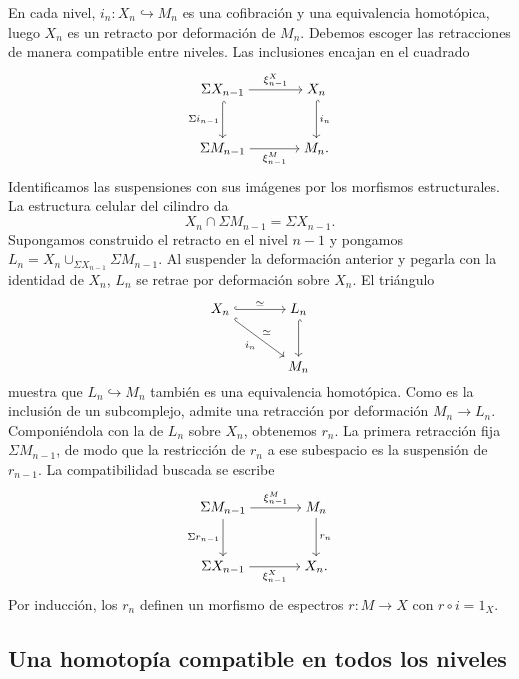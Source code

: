 En cada nivel, $i_n\colon X_n\hookrightarrow M_n$ es una cofibración y una equivalencia homotópica, luego $X_n$ es un retracto por deformación de $M_n$. Debemos escoger las retracciones de manera compatible entre niveles. Las inclusiones encajan en el cuadrado
\[
\begin{tikzcd}[cramped,column sep=large,row sep=large]
\Sigma X_{n-1} \arrow[r,"\xi^X_{n-1}"] \arrow[d,hook,"\Sigma i_{n-1}"']
& X_n \arrow[d,hook,"i_n"]\\
\Sigma M_{n-1} \arrow[r,"\xi^M_{n-1}"'] & M_n.
\end{tikzcd}
\]
Identificamos las suspensiones con sus imágenes por los morfismos estructurales. La estructura celular del cilindro da
\[
X_n\cap\Sigma M_{n-1}=\Sigma X_{n-1}.
\]
Supongamos construido el retracto en el nivel $n-1$ y pongamos $L_n=X_n\cup_{\Sigma X_{n-1}}\Sigma M_{n-1}$. Al suspender la deformación anterior y pegarla con la identidad de $X_n$, $L_n$ se retrae por deformación sobre $X_n$. El triángulo
\[
\begin{tikzcd}[cramped,column sep=large,row sep=large]
X_n \arrow[r,hook,"\simeq"] \arrow[dr,hook,"i_n"',"\simeq"]
& L_n \arrow[d,hook]\\
& M_n
\end{tikzcd}
\]
muestra que $L_n\hookrightarrow M_n$ también es una equivalencia homotópica. Como es la inclusión de un subcomplejo, admite una retracción por deformación $M_n\to L_n$. Componiéndola con la de $L_n$ sobre $X_n$, obtenemos $r_n$. La primera retracción fija $\Sigma M_{n-1}$, de modo que la restricción de $r_n$ a ese subespacio es la suspensión de $r_{n-1}$. La compatibilidad buscada se escribe
\[
\begin{tikzcd}[cramped,column sep=large,row sep=large]
\Sigma M_{n-1} \arrow[r,"\xi^M_{n-1}"] \arrow[d,"\Sigma r_{n-1}"']
& M_n \arrow[d,"r_n"]\\
\Sigma X_{n-1} \arrow[r,"\xi^X_{n-1}"'] & X_n.
\end{tikzcd}
\]
Por inducción, los $r_n$ definen un morfismo de espectros $r\colon M\to X$ con $r\circ i=1_X$.

\subsection{Una homotopía compatible en todos los niveles}

